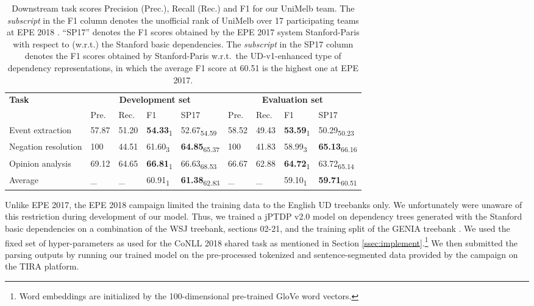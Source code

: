 \documentclass[11pt,letterpaper]{article}
\begin{document}
\begin{table*}[t]
\centering

\begin{tabular}{l|lll|l||lll|l}
\hline
\multirow{2}{*}{\bf Task}  & \multicolumn{4}{c||}{\bf Development set} & \multicolumn{4}{c}{\bf Evaluation set}\\ 
\cline{2-9}
& Pre. & Rec. & F1 & SP17 & Pre. & Rec. & F1 & SP17 \\
\hline
Event extraction & 57.87	& 51.20	& \textbf{54.33}\textsubscript{1} & 52.67\textsubscript{54.59} & 58.52	& 49.43	& \textbf{53.59}\textsubscript{1} & 50.29\textsubscript{50.23} \\
Negation resolution & 100 &	44.51 &	61.60\textsubscript{3} & \textbf{64.85}\textsubscript{65.37} & 100	& 41.83	& 58.99\textsubscript{3} & \textbf{65.13}\textsubscript{66.16} \\
Opinion analysis & 69.12	& 64.65	& \textbf{66.81}\textsubscript{1} & 66.63\textsubscript{68.53} & 66.67	& 62.88	& \textbf{64.72}\textsubscript{1} & 63.72\textsubscript{65.14} \\
\hline
Average & \_ & \_ & 60.91\textsubscript{1} & \textbf{61.38}\textsubscript{62.83} & \_ & \_ & 59.10\textsubscript{1} & \textbf{59.71}\textsubscript{60.51}\\
\hline
\end{tabular}
\caption{Downstream task scores Precision (Prec.), Recall (Rec.) and F1 for our UniMelb team. The \textit{subscript} in the F1 column denotes the unofficial rank of UniMelb over 17 participating teams at EPE 2018 . ``SP17'' denotes the F1 scores obtained by the EPE 2017  system Stanford-Paris  with respect to (w.r.t.) the Stanford basic dependencies. The \textit{subscript} in the SP17 column denotes the F1 scores obtained by Stanford-Paris w.r.t.\ the UD-v1-enhanced type of dependency representations, in which the average F1 score at 60.51 is the highest one at EPE 2017.}
\label{tab:epe18}
\end{table*}


Unlike  EPE 2017, the EPE 2018 campaign limited the training data to the English UD treebanks only. We unfortunately were unaware of this restriction during development of our model. Thus, we trained a jPTDP v2.0 model on dependency trees generated with the Stanford basic dependencies on a  combination of the WSJ treebank, sections 02-21, and the training split of the GENIA treebank \cite{I05-2038}. We used the fixed set of hyper-parameters as used for the CoNLL 2018 shared task as mentioned in Section \ref{ssec:implement}.\footnote{Word embeddings are initialized by the 100-dimensional pre-trained GloVe word vectors.} We then submitted the parsing outputs by running our trained model on the pre-processed tokenized and sentence-segmented data provided by the campaign on the TIRA platform.
\end{document}
